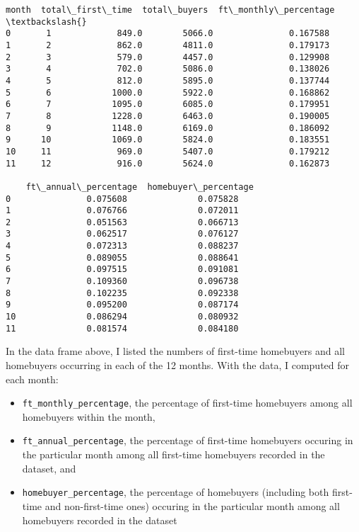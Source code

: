 \documentclass[11pt]{article}
\makeatletter
\providecommand{\tightlist}{%
      \setlength{\itemsep}{0pt}\setlength{\parskip}{0pt}}
\newcommand{\boxspacing}{\kern\kvtcb@left@rule\kern\kvtcb@boxsep}
\newcommand{\prompt}[4]{
        \ttfamily\llap{{\color{#2}[#3]:\hspace{3pt}#4}}\vspace{-\baselineskip}
    }
\makeatother
\begin{document}
            \begin{tcolorbox}[breakable, size=fbox, boxrule=.5pt, pad at break*=1mm, opacityfill=0]
\prompt{Out}{outcolor}{4}{\boxspacing}
\begin{Verbatim}[commandchars=\\\{\}]
    month  total\_first\_time  total\_buyers  ft\_monthly\_percentage  \textbackslash{}
0       1             849.0        5066.0               0.167588
1       2             862.0        4811.0               0.179173
2       3             579.0        4457.0               0.129908
3       4             702.0        5086.0               0.138026
4       5             812.0        5895.0               0.137744
5       6            1000.0        5922.0               0.168862
6       7            1095.0        6085.0               0.179951
7       8            1228.0        6463.0               0.190005
8       9            1148.0        6169.0               0.186092
9      10            1069.0        5824.0               0.183551
10     11             969.0        5407.0               0.179212
11     12             916.0        5624.0               0.162873

    ft\_annual\_percentage  homebuyer\_percentage
0               0.075608              0.075828
1               0.076766              0.072011
2               0.051563              0.066713
3               0.062517              0.076127
4               0.072313              0.088237
5               0.089055              0.088641
6               0.097515              0.091081
7               0.109360              0.096738
8               0.102235              0.092338
9               0.095200              0.087174
10              0.086294              0.080932
11              0.081574              0.084180
\end{Verbatim}
\end{tcolorbox}
        
    In the data frame above, I listed the numbers of first-time homebuyers
and all homebuyers occurring in each of the 12 months. With the data, I
computed for each month:

\begin{itemize}
\tightlist
\item
  \texttt{ft\_monthly\_percentage}, the percentage of first-time
  homebuyers among all homebuyers within the month,
\item
  \texttt{ft\_annual\_percentage}, the percentage of first-time
  homebuyers occuring in the particular month among all first-time
  homebuyers recorded in the dataset, and
\item
  \texttt{homebuyer\_percentage}, the percentage of homebuyers
  (including both first-time and non-first-time ones) occuring in the
  particular month among all homebuyers recorded in the dataset
\end{itemize}
\end{document}
